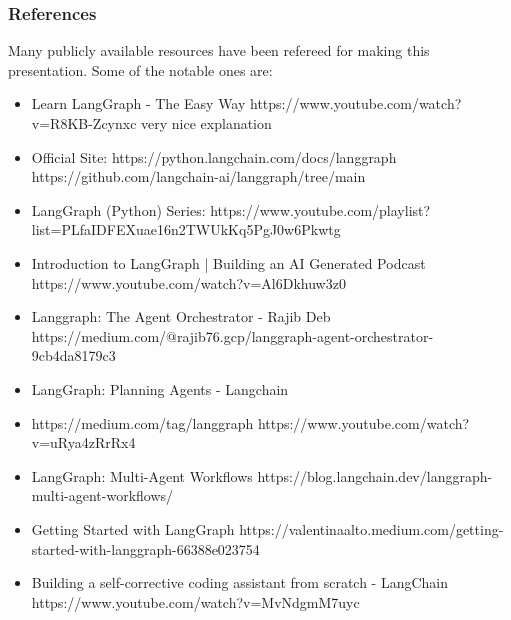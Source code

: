 \begin{frame}\frametitle{References}
Many publicly available resources have been refereed for making this presentation. Some of the notable ones are:
\footnotesize
\begin{itemize}
\item Learn LangGraph - The Easy Way https://www.youtube.com/watch?v=R8KB-Zcynxc very nice explanation
\item Official Site: https://python.langchain.com/docs/langgraph https://github.com/langchain-ai/langgraph/tree/main
\item LangGraph (Python) Series: https://www.youtube.com/playlist?list=PLfaIDFEXuae16n2TWUkKq5PgJ0w6Pkwtg
\item Introduction to LangGraph | Building an AI Generated Podcast https://www.youtube.com/watch?v=Al6Dkhuw3z0
\item Langgraph: The Agent Orchestrator - Rajib Deb https://medium.com/@rajib76.gcp/langgraph-agent-orchestrator-9cb4da8179c3
\item LangGraph: Planning Agents - Langchain 
\item https://medium.com/tag/langgraph https://www.youtube.com/watch?v=uRya4zRrRx4
\item LangGraph: Multi-Agent Workflows https://blog.langchain.dev/langgraph-multi-agent-workflows/
\item Getting Started with LangGraph https://valentinaalto.medium.com/getting-started-with-langgraph-66388e023754
\item Building a self-corrective coding assistant from scratch - LangChain https://www.youtube.com/watch?v=MvNdgmM7uyc
\end{itemize}

\end{frame}